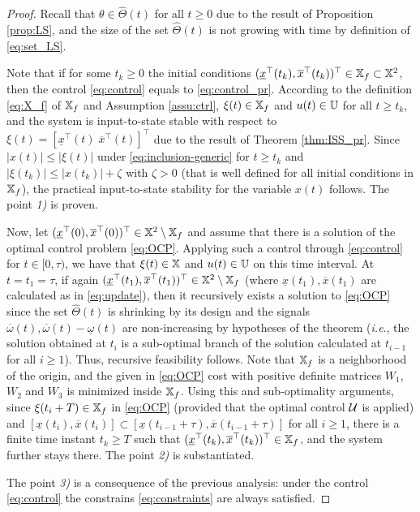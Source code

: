 \begin{proof}
	Recall that $\theta\in\hat{\Theta}(t)$ for all $t\geq0$ due to the
	result of Proposition \ref{prop:LS}, and the size of the set $\hat{\Theta}(t)$
	is not growing with time by definition of \eqref{eq:set_LS}.
	
	Note that if for some $t_{k}\geq0$ the initial conditions $(\underline{x}^{\top}(t_{k}),\overline{x}^{\top}(t_{k}))^{\top}\in\mathbb{X}_{f}\subset\mathbb{X}^{2}$,
	then the control \eqref{eq:control} equals to \eqref{eq:control_pr}.
	According to the definition \eqref{eq:X_f} of $\mathbb{X}_{f}$ and Assumption
	\ref{assu:ctrl}, $\xi(t)\in\mathbb{X}_{f}$ and $u(t)\in\mathbb{U}$ for all $t\geq t_{k}$,
	and the system is input-to-state stable with respect to $\xi(t)=[\underline{x}^{\top}(t)\;\overline{x}^{\top}(t)]^{\top}$
	due to the result of Theorem \ref{thm:ISS_pr}. Since $|x(t)|\leq|\xi(t)|$
	under \eqref{eq:inclusion-generic} for $t\geq t_{k}$ and $|\xi(t_{k})|\leq|x(t_{k})|+\zeta$
	with $\zeta>0$ (that is well defined for all initial conditions in
	$\mathbb{X}_{f}$), the practical input-to-state stability for the variable
	$x(t)$ follows. The point \emph{1)} is proven.
	
	Now, let $(\underline{x}^{\top}(0),\overline{x}^{\top}(0))^{\top}\in\mathbb{X}^{2}\setminus\mathbb{X}_{f}$
	and assume that there is a solution of the optimal control problem
	\eqref{eq:OCP}. Applying such a control through \eqref{eq:control}
	for $t\in[0,\tau)$, we have that $\xi(t)\in\mathbb{X}$ and $u(t)\in\mathbb{U}$
	on this time interval. At $t=t_{1}=\tau$, if again $(\underline{x}^{\top}(t_{1}),\overline{x}^{\top}(t_{1}))^{\top}\in\mathbb{X}^{2}\setminus\mathbb{X}_{f}$
	(where $\underline{x}(t_{1}),\overline{x}(t_{1})$ are calculated
	as in \eqref{eq:update}), then it recursively exists a solution to
	\eqref{eq:OCP} since the set $\hat{\Theta}(t)$ is shrinking by its
	design and the signals $\overline{\omega}(t),\overline{\omega}(t)-\underline{\omega}(t)$
	are non-increasing by hypotheses of the theorem (\emph{i.e}., the
	solution obtained at $t_{i}$ is a sub-optimal branch of the solution
	calculated at $t_{i-1}$ for all $i\geq1$). Thus, recursive feasibility
	follows. Note that $\mathbb{X}_{f}$ is a neighborhood of the origin, and
	the given in \eqref{eq:OCP} cost with positive definite matrices
	$W_{1}$, $W_{2}$ and $W_{3}$ is minimized inside $\mathbb{X}_{f}$. Using
	this and sub-optimality arguments, since $\xi(t_{i}+T)\in\mathbb{X}_{f}$
	in \eqref{eq:OCP} (provided that the optimal control $\mathcal{U}$ is applied)
	and $[\underline{x}(t_{i}),\overline{x}(t_{i})]\subset[\underline{x}(t_{i-1}+\tau),\overline{x}(t_{i-1}+\tau)]$
	for all $i\geq1$, there is a finite time instant $t_{k}\geq T$ such
	that $(\underline{x}^{\top}(t_{k}),\overline{x}^{\top}(t_{k}))^{\top}\in\mathbb{X}_{f}$,
	and the system further stays there. The point \emph{2)} is substantiated.
	
	The point \emph{3)} is a consequence of the previous analysis: under
	the control \eqref{eq:control} the constrains \eqref{eq:constraints}
	are always satisfied.
\end{proof}

